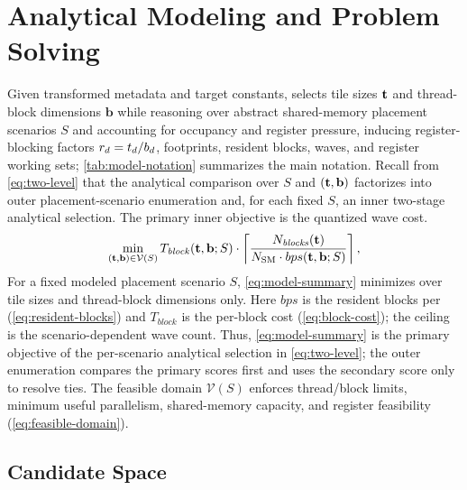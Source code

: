 \section{Analytical Modeling and Problem Solving}
\label{sec:model}

Given transformed metadata and target constants, \name selects tile sizes \(\mathbf{t}\) and thread-block dimensions \(\mathbf{b}\) while reasoning over abstract shared-memory placement scenarios \(S\) and accounting for occupancy and register pressure, inducing register-blocking factors \(r_d=t_d/b_d\), footprints, resident blocks, waves, and register working sets; \autoref{tab:model-notation} summarizes the main notation. Recall from \autoref{eq:two-level} that the analytical comparison over \(S\) and \((\mathbf{t},\mathbf{b})\) factorizes into outer placement-scenario enumeration and, for each fixed \(S\), an inner two-stage analytical selection. The primary inner objective is the quantized wave cost.
\begin{equation}
\min_{(\mathbf{t},\mathbf{b})\in\mathcal{V}(S)}
T_{\mathit{block}}(\mathbf{t},\mathbf{b};S)
\cdot
\left\lceil
\dfrac{N_{\mathit{blocks}}(\mathbf{t})}
      {N_{\mathrm{SM}} \cdot bps(\mathbf{t},\mathbf{b};S)}
\right\rceil,
\label{eq:model-summary}
\end{equation}
For a fixed modeled placement scenario \(S\), \autoref{eq:model-summary} minimizes over tile sizes and thread-block dimensions only. Here \(bps\) is the resident blocks per \sm (\autoref{eq:resident-blocks}) and \(T_{\mathit{block}}\) is the per-block cost (\autoref{eq:block-cost}); the ceiling is the scenario-dependent wave count. Thus, \autoref{eq:model-summary} is the primary objective of the per-scenario analytical selection in \autoref{eq:two-level}; the outer enumeration compares the primary scores first and uses the secondary score only to resolve ties. The feasible domain \(\mathcal{V}(S)\) enforces thread/block limits, minimum useful parallelism, shared-memory capacity, and register feasibility (\autoref{eq:feasible-domain}).

\subsection{Candidate Space}
\label{sec:abstraction}
\label{sec:placement}

